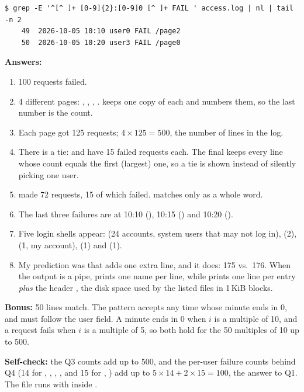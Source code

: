 \documentclass[11pt,a4paper]{article}
\begin{document}
\begin{lstlisting}[caption={Bonus: failed requests at minutes ending in 0}]
$ grep -E '^[^ ]+ [0-9]{2}:[0-9]0 [^ ]+ FAIL ' access.log | nl | tail -n 2
    49  2026-10-05 10:10 user0 FAIL /page2
    50  2026-10-05 10:20 user3 FAIL /page0
\end{lstlisting}

\textbf{Answers:}
\begin{enumerate}[label=Q\arabic*.]
  \item 100 requests failed.
  \item 4 different pages: , , , .
   keeps one copy of each and  numbers them, so the last number is the
  count.
  \item Each page got 125 requests; \(4 \times 125 = 500\), the number of lines in the log.
  \item There is a tie:  and  have 15 failed requests each. The final
   keeps every line whose count equals the first (largest) one, so a tie is shown
  instead of silently picking one user.
  \item {} made 72 requests, 15 of which failed.  matches  only
  as a whole word.
  \item The last three failures are at 10:10 (), 10:15 () and 10:20
  ().
  \item Five login shells appear:  (24 accounts, system users that may
  not log in),  (2),  (1, my account),
   (1) and  (1).
  \item My prediction was that  adds one extra line, and it does: 175 vs.\ 176.
  When the output is a pipe,  prints one name per line, while  prints one
  line per entry \emph{plus} the header , the disk space used by the listed
  files in 1\,KiB blocks.
\end{enumerate}

\textbf{Bonus:} 50 lines match. The pattern  accepts any time whose
minute ends in 0, and  must follow the user field. A minute ends in 0 when
\(i\) is a multiple of 10, and a request fails when \(i\) is a multiple of 5, so both hold for
the 50 multiples of 10 up to 500.

\textbf{Self-check:} the Q3 counts add up to 500, and the per-user failure counts behind Q4
(14 for , , , ,  and 15 for
, ) add up to \(5 \times 14 + 2 \times 15 = 100\), the answer to Q1.
The file runs with  inside .
\end{document}

